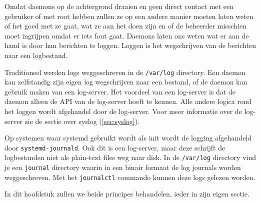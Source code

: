 Omdat daemons op de achtergrond draaien en geen direct contact met een gebruiker of met root hebben zullen ze op een andere manier moeten laten weten of het goed met ze gaat, wat ze aan het doen zijn en of de beheerder misschien moet ingrijpen omdat er iets fout gaat. Daemons laten ons weten wat er aan de hand is door hun berichten te loggen. Loggen is het wegschrijven van de berichten naar een logbestand.

Traditioneel werden logs weggeschreven in de \texttt{/var/log} directory. Een daemon kan zelfstandig zijn eigen log wegschrijven naar een bestand, of de daemon kan gebruik maken van een log-server. Het voordeel van een log-server is dat de daemon alleen de API van de log-server hoeft te kennen. Alle andere logica rond het loggen wordt afgehandel door de log-server. Voor meer informatie over de log-server zie de sectie over syslog (\ref{sec:syslog}).

Op systemen waar systemd gebruikt wordt als init wordt de logging afgehandeld door \texttt{systemd-journald}. Ook dit is een log-server, maar deze schrijft de logbestanden niet als plain-text files weg naar disk. In de \texttt{/var/log} directory vind je een \texttt{journal} directory waarin in een binair formaat de log journals worden weggeschreven. Met het \texttt{journalctl} commando kunnen deze logs gelezen worden.

In dit hoofdstuk zullen we beide principes behandelen, ieder in zijn eigen sectie.

